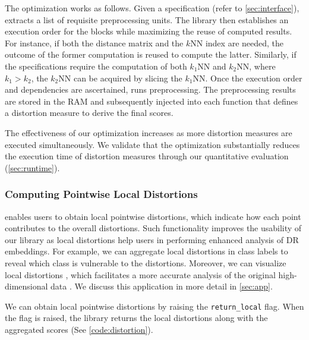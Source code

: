 The optimization works as follows. Given a specification (refer to \autoref{sec:interface}), \library extracts a list of requisite preprocessing units. The library then establishes an execution order for the blocks while maximizing the reuse of computed results. For instance, if both the distance matrix and the $k$NN index are needed, the outcome of the former computation is reused to compute the latter. Similarly, if the specifications require the computation of both $k_1$NN and $k_2$NN, where $k_1 > k_2$, the $k_2$NN can be acquired by slicing the $k_1$NN.
Once the execution order and dependencies are ascertained, \library runs preprocessing. The preprocessing results are stored in the RAM and subsequently injected into each function that defines a distortion measure to derive the final scores. 


The effectiveness of our optimization increases as more distortion measures are executed simultaneously. We validate that the optimization substantially reduces the execution time of distortion measures through our quantitative evaluation (\autoref{sec:runtime}).


\subsubsection{Computing Pointwise Local Distortions}

\label{sec:pointwise}

\library enables users to obtain local pointwise distortions, which indicate how each point contributes to the overall distortions. 
Such functionality improves the usability of our library as local distortions help users in performing enhanced analysis of DR embeddings. For example, we can aggregate local distortions in class labels to reveal which class is vulnerable to the distortions.
Moreover, we can visualize local distortions \cite{lespinats11cgf, 
jeon21tvcg}, which facilitates a more accurate analysis of the original high-dimensional data \cite{jeon21tvcg}. We discuss this application in more detail in \autoref{sec:app}.

We can obtain local pointwise distortions by raising the \texttt{return\_local} flag. When the flag is raised, the library returns the local distortions along with the aggregated scores (See \autoref{code:distortion}). 
  




